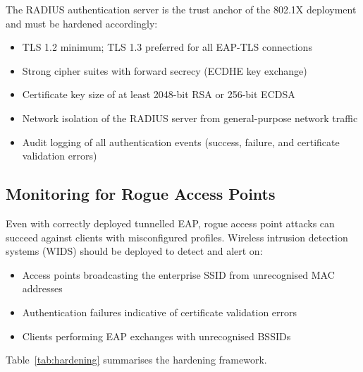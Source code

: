 \documentclass[journal]{IEEEtran}
\begin{document}
The RADIUS authentication server is the trust anchor of the 802.1X deployment and
must be hardened accordingly:

\begin{itemize}
  \item TLS 1.2 minimum; TLS 1.3 preferred for all EAP-TLS connections
  \item Strong cipher suites with forward secrecy (ECDHE key exchange)
  \item Certificate key size of at least 2048-bit RSA or 256-bit ECDSA
  \item Network isolation of the RADIUS server from general-purpose network traffic
  \item Audit logging of all authentication events (success, failure, and
        certificate validation errors)
\end{itemize}

\subsection{Monitoring for Rogue Access Points}

Even with correctly deployed tunnelled EAP, rogue access point attacks can succeed
against clients with misconfigured profiles. Wireless intrusion detection systems
(WIDS) should be deployed to detect and alert on:

\begin{itemize}
  \item Access points broadcasting the enterprise SSID from unrecognised MAC addresses
  \item Authentication failures indicative of certificate validation errors
  \item Clients performing EAP exchanges with unrecognised BSSIDs
\end{itemize}

Table~\ref{tab:hardening} summarises the hardening framework.
\end{document}
